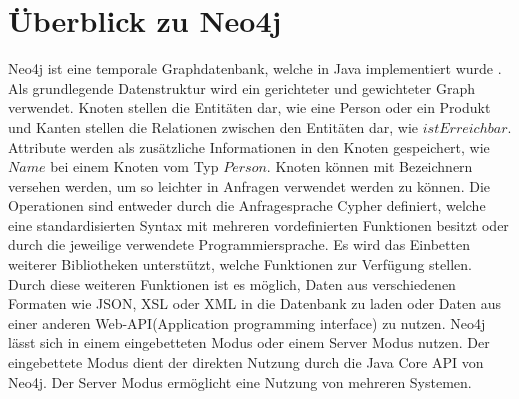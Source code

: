 \section{Überblick zu Neo4j}
Neo4j ist eine temporale Graphdatenbank, welche in Java implementiert wurde \parencite{vukotic2015neo4j}. Als grundlegende Datenstruktur wird ein gerichteter und gewichteter Graph verwendet. Knoten stellen die Entitäten dar, wie eine Person oder ein Produkt und  Kanten stellen die Relationen zwischen den Entitäten dar, wie $istErreichbar$. Attribute werden als zusätzliche Informationen in den Knoten gespeichert, wie $Name$ bei einem Knoten vom Typ $Person$. Knoten können mit Bezeichnern versehen werden, um so leichter in Anfragen  verwendet werden zu können. Die Operationen sind entweder durch die  Anfragesprache  Cypher definiert, welche eine standardisierten Syntax mit  mehreren vordefinierten Funktionen besitzt oder durch die jeweilige verwendete Programmiersprache. Es wird das Einbetten weiterer Bibliotheken unterstützt, welche  Funktionen zur Verfügung stellen. Durch diese weiteren Funktionen ist es möglich, Daten aus verschiedenen Formaten wie JSON, XSL oder XML in die Datenbank zu laden oder Daten aus einer anderen Web-API(Application programming interface) zu nutzen. Neo4j lässt sich in einem eingebetteten Modus oder einem  Server Modus nutzen. Der eingebettete Modus dient der direkten  Nutzung durch die Java Core API von Neo4j. Der Server Modus ermöglicht eine Nutzung von mehreren Systemen. 

